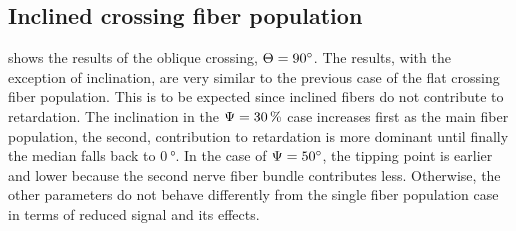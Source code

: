 \subsection{Inclined crossing fiber population}
 shows the results of the oblique crossing, \ie{} $\textnormal{$\Theta$}=\SI{90}{\degree}$.
The results, with the exception of inclination, are very similar to the previous case of the flat crossing fiber population.
This is to be expected since inclined fibers do not contribute to retardation.
The inclination in the $\textnormal{$\Psi$}=\SI{30}{\percent}$ case increases first as the main fiber population, \ie{} the second, contribution to retardation is more dominant until finally the median falls back to $\SI{0}{\degree}$.
In the case of $\textnormal{$\Psi$}=\SI{50}{\degree}$, the tipping point is earlier and lower because the second nerve fiber bundle contributes less.
Otherwise, the other parameters do not behave differently from the single fiber population case in terms of reduced signal and its effects.
% 
% 
% 
